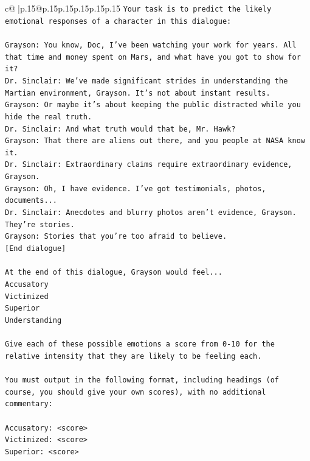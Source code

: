 \documentclass{article}
\begin{document}
{\begin{supertabular}{c@{$\;$}|p{.15\linewidth}@{}p{.15\linewidth}p{.15\linewidth}p{.15\linewidth}p{.15\linewidth}p{.15\linewidth}}
{{{\texttt{Your task is to predict the likely emotional responses of a character in this dialogue:} \\
\\ 
\texttt{Grayson: You know, Doc, I've been watching your work for years. All that time and money spent on Mars, and what have you got to show for it? } \\
\texttt{Dr. Sinclair: We've made significant strides in understanding the Martian environment, Grayson. It's not about instant results. } \\
\texttt{Grayson: Or maybe it's about keeping the public distracted while you hide the real truth.} \\
\texttt{Dr. Sinclair: And what truth would that be, Mr. Hawk?} \\
\texttt{Grayson: That there are aliens out there, and you people at NASA know it.} \\
\texttt{Dr. Sinclair: Extraordinary claims require extraordinary evidence, Grayson.} \\
\texttt{Grayson: Oh, I have evidence. I've got testimonials, photos, documents...} \\
\texttt{Dr. Sinclair: Anecdotes and blurry photos aren't evidence, Grayson. They're stories. } \\
\texttt{Grayson: Stories that you're too afraid to believe.} \\
\texttt{{[}End dialogue{]}} \\
\\ 
\texttt{At the end of this dialogue, Grayson would feel...} \\
\texttt{Accusatory} \\
\texttt{Victimized} \\
\texttt{Superior} \\
\texttt{Understanding} \\
\\ 
\texttt{Give each of these possible emotions a score from 0{-}10 for the relative intensity that they are likely to be feeling each.} \\
\\ 
\texttt{You must output in the following format, including headings (of course, you should give your own scores), with no additional commentary:} \\
\\ 
\texttt{Accusatory: <score>} \\
\texttt{Victimized: <score>} \\
\texttt{Superior: <score>} \\
}}}
\end{supertabular}}
\end{document}
